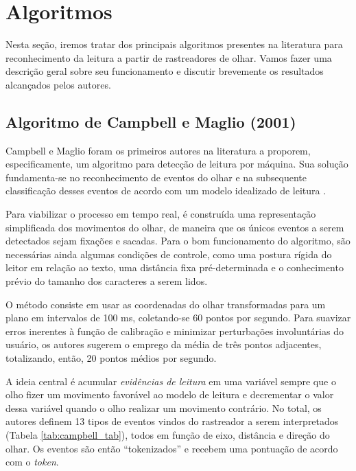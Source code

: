 \documentclass[12pt]{article}
\begin{document}
	\section{Algoritmos}
	
		Nesta seção, iremos tratar dos principais algoritmos presentes na literatura para reconhecimento da leitura a partir de rastreadores de olhar. Vamos fazer uma descrição geral sobre seu funcionamento e discutir brevemente os resultados alcançados pelos autores.  
	
		\subsection{Algoritmo de Campbell e Maglio (2001)}
		Campbell e Maglio foram os primeiros autores na literatura a proporem, especificamente, um algoritmo para detecção de leitura por máquina. Sua solução fundamenta-se no reconhecimento de eventos do olhar e na subsequente classificação desses eventos de acordo com um modelo idealizado de leitura \cite{Campbell-2001}.
		
		Para viabilizar o processo em tempo real, é construída uma representação simplificada dos movimentos do olhar, de maneira que os únicos eventos a serem detectados sejam fixações e sacadas. Para o bom funcionamento do algoritmo, são necessárias ainda algumas condições de controle, como uma postura rígida do leitor em relação ao texto, uma distância fixa pré-determinada e o conhecimento prévio do tamanho dos caracteres a serem lidos.
		
		O método consiste em usar as coordenadas do olhar transformadas para um plano em intervalos de 100 ms, coletando-se 60 pontos por segundo. Para suavizar erros inerentes à função de calibração e minimizar perturbações involuntárias do usuário, os autores sugerem o emprego da média de três pontos adjacentes, totalizando, então, 20 pontos médios por segundo.
		
		A ideia central é acumular \textit{evidências de leitura} em uma variável sempre que o olho fizer um movimento favorável ao modelo de leitura e decrementar o valor dessa variável quando o olho realizar um movimento contrário. No total, os autores definem 13 tipos de eventos vindos do rastreador a serem interpretados (Tabela \ref{tab:campbell_tab}), todos em função de eixo, distância e direção do olhar. Os eventos são então ``tokenizados'' e recebem uma pontuação de acordo com o \textit{token}.
		
\end{document}
